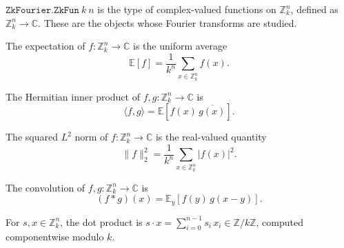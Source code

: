 \begin{definition}
\label{ZkFourier.ZkFun}
\leanok
{}
$\texttt{ZkFourier.ZkFun}\ k\ n$ is the type of complex-valued functions on
$\mathbb{Z}_k^n$, defined as $\mathbb{Z}_k^n \to \mathbb{C}$.  These are the
objects whose Fourier transforms are studied.
\end{definition}

\begin{definition}[Expectation]
\label{ZkFourier.expectation}
\leanok
{}
The expectation of $f : \mathbb{Z}_k^n \to \mathbb{C}$ is the uniform average
\[
  \mathbb{E}[f] = \frac{1}{k^n} \sum_{x \in \mathbb{Z}_k^n} f(x).
\]
\end{definition}

\begin{definition}
\label{ZkFourier.inner_product}
\leanok
{}
The Hermitian inner product of $f, g : \mathbb{Z}_k^n \to \mathbb{C}$ is
\[
  \langle f, g \rangle = \mathbb{E}\!\left[f(x)\,\overline{g(x)}\right].
\]
\end{definition}

\begin{definition}
\label{ZkFourier.L2_norm_sq}
\leanok
{}
The squared $L^2$ norm of $f : \mathbb{Z}_k^n \to \mathbb{C}$ is the
real-valued quantity
\[
  \|f\|_2^2 = \frac{1}{k^n} \sum_{x \in \mathbb{Z}_k^n} |f(x)|^2.
\]
\end{definition}

\begin{definition}[Convolution]
\label{ZkFourier.convolution}
\leanok
{}
The convolution of $f, g : \mathbb{Z}_k^n \to \mathbb{C}$ is
\[
  (f * g)(x) = \mathbb{E}_{y}\!\left[f(y)\,g(x - y)\right].
\]
\end{definition}

\begin{definition}
\label{ZkFourier.zkDot}
\leanok
{}
For $s, x \in \mathbb{Z}_k^n$, the dot product is
$s \cdot x = \sum_{i=0}^{n-1} s_i \, x_i \in \mathbb{Z}/k\mathbb{Z}$,
computed componentwise modulo $k$.
\end{definition}

